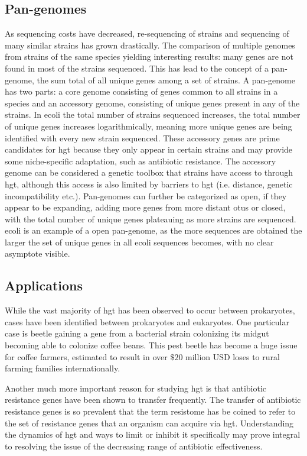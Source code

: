 \documentclass[12pt,letter]{article}
\begin{document}
\subsection*{Pan-genomes}%
As sequencing costs have decreased, re-sequencing of strains and sequencing of many similar strains has grown drastically.
The comparison of multiple genomes from strains of the same species yielding interesting results: many genes are not found in most of the strains sequenced\citep{toolpan}.
This has lead to the concept of a pan-genome, the sum total of all unique genes among a set of strains\citep{pang}.
A pan-genome has two parts: a core genome consisting of genes common to all strains in a species and an accessory genome, consisting of unique genes present in any of the strains\citep{pang}.
In \ac{ecoli} the total number of strains sequenced increases, the total number of unique genes increases logarithmically, meaning more unique genes are being identified with every new strain sequenced\citep{ecopan}.
These accessory genes are prime candidates for \ac{hgt} because they only appear in certain strains and may provide some niche-specific adaptation, such as antibiotic resistance\citep{pang}.
The accessory genome can be considered a genetic toolbox that strains have access to through \ac{hgt}, although this access is also limited by barriers to \ac{hgt} (i.e. distance, genetic incompatibility etc.).
Pan-genomes can further be categorized as open, if they appear to be expanding, adding more genes from more distant \ac{otu}s or closed, with the total number of unique genes plateauing as more strains are sequenced\citep{pang}.
\ac{ecoli} is an example of a open pan-genome, as the more sequences are obtained the larger the set of unique genes in all \ac{ecoli} sequences becomes, with no clear asymptote visible\citep{pang}.
\subsection*{Applications}
While the vast majority of \ac{hgt} has been observed to occur between prokaryotes, cases have been identified between prokaryotes and eukaryotes.
One particular case is beetle gaining a gene from a bacterial strain colonizing its midgut becoming able to colonize coffee beans\citep{beetle}.
This pest beetle has become a huge issue for coffee farmers, estimated to result in over $\$20$ million USD loses to rural farming families internationally\citep{beetle}.\par
Another much more important reason for studying \ac{hgt} is that antibiotic resistance genes have been shown to transfer frequently\citep{amrhgt}.
The transfer of antibiotic resistance genes is so prevalent that the term resistome has be coined to refer to the set of resistance genes that an organism can acquire via \ac{hgt}\citep{amrhgt}.
Understanding the dynamics of \ac{hgt} and ways to limit or inhibit it specifically may prove integral to resolving the issue of the decreasing range of antibiotic effectiveness\citep{amrhgt}.
\end{document}
